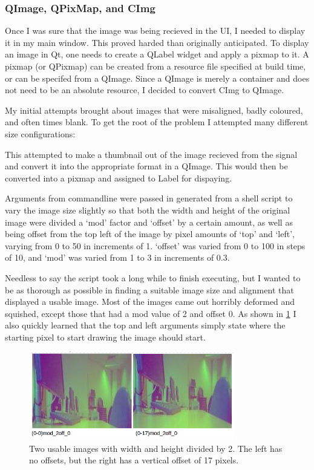 \documentclass[11pt]{article} %
\begin{document}
\subsubsection{QImage, QPixMap, and CImg}
Once I was sure that the image was being recieved in the UI, I needed to display it in my main window. This proved harded than originally anticipated. To display an image in Qt, one needs to create a QLabel widget and apply a pixmap to it. A pixmap (or QPixmap) can be created from a resource file specified at build time, or can be specifed from a QImage. Since a QImage is merely a container and does not need to be an absolute resource, I decided to convert CImg to QImage. 

My initial attempts brought about images that were misaligned, badly coloured, and often times blank. To get the root of the problem I attempted many different size configurations:
\begin{frame}[fragile]
	
\end{frame}
This attempted to make a thumbnail out of the image recieved from the signal and convert it into the appropriate format in a QImage. This would then be converted into a pixmap and assigned to Label for dispaying.

Arguments from commandline were passed in generated from a shell script to vary the image size slightly so that both the width and height of the original image were divided a ‘mod’ factor and ‘offset’ by a certain amount, as well as being offset from the top left of the image by pixel amounts of ‘top’ and ‘left’, varying from 0 to 50 in increments of 1. ‘offset’ was varied from 0 to 100 in steps of 10, and ‘mod’ was varied from 1 to 3 in increments of 0.3.

Needless to say the script took a long while to finish executing, but I wanted to be as thorough as possible in finding a suitable image size and alignment that displayed a usable image. Most of the images came out horribly deformed and squished, except those that had a mod value of 2 and offset 0. As shown in \cref{fig:shell1} I also quickly learned that the top and left arguments simply state where the starting pixel to start drawing the image should start.
\begin{figure}
	\begin{center}
		\includegraphics[width=0.8\textwidth]{../images/qpix/shell1}
	\end{center}
	\vspace{-20pt}
	\caption{Two usable images with width and height divided by 2. The left has no offsets, but the right has a vertical offset of 17 pixels. }
	\label{fig:shell1}
\end{figure}
\end{document}
